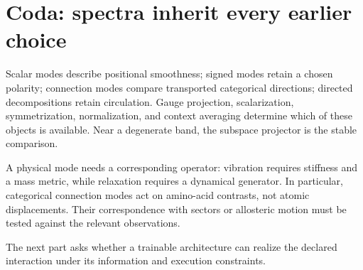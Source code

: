 \section*{Coda: spectra inherit every earlier choice}

Scalar modes describe positional smoothness; signed modes retain a chosen polarity; connection
modes compare transported categorical directions; directed decompositions retain circulation.
Gauge projection, scalarization, symmetrization, normalization, and context averaging determine
which of these objects is available.  Near a degenerate band, the subspace projector is the
stable comparison.

A physical mode needs a corresponding operator: vibration requires stiffness and a mass metric,
while relaxation requires a dynamical generator.  In particular, categorical connection modes
act on amino-acid contrasts, not atomic displacements.  Their correspondence with sectors or
allosteric motion must be tested against the relevant observations.

The next part asks whether a trainable architecture can realize the declared interaction under
its information and execution constraints.
